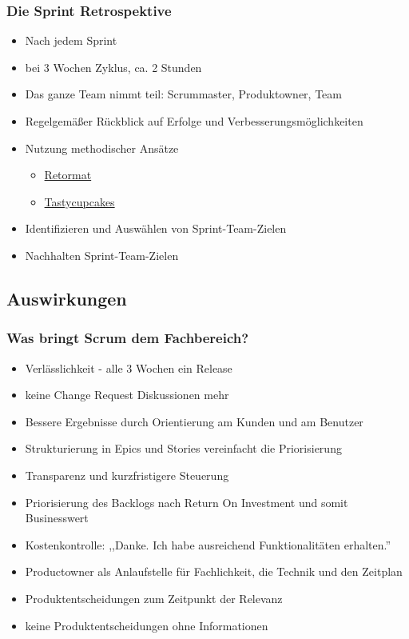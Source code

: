 \frame
{
  \frametitle{Die Sprint Retrospektive}
  \begin{itemize}
      \item{Nach jedem Sprint}
      \item{bei 3 Wochen Zyklus, ca. 2 Stunden}
      \item{Das ganze Team nimmt teil: Scrummaster, Produktowner, Team}
      \item{Regelgemäßer Rückblick auf Erfolge und Verbesserungsmöglichkeiten}
      \item{Nutzung methodischer Ansätze
          \begin{itemize}
            \item{\href{http://plans-for-retrospectives.com}{Retormat}}
            \item{\href{http://tastycupcakes.org/}{Tastycupcakes}}
          \end{itemize}
      }
      \item{Identifizieren und Auswählen von Sprint-Team-Zielen}
      \item{Nachhalten Sprint-Team-Zielen}
  \end{itemize}
}


\subsection{Auswirkungen}
\frame
{
  \frametitle{Was bringt Scrum dem Fachbereich?}
  \begin{itemize}
    \item{Verlässlichkeit - alle 3 Wochen ein Release}
    \item{keine Change Request Diskussionen mehr}
    \item{Bessere Ergebnisse durch Orientierung am Kunden und am Benutzer}
    \item{Strukturierung in Epics und Stories vereinfacht die Priorisierung}
    \item{Transparenz und kurzfristigere Steuerung} 
    \item{Priorisierung des Backlogs nach Return On Investment und somit Businesswert}
    \item{Kostenkontrolle: ,,Danke. Ich habe ausreichend Funktionalitäten erhalten.''}
    \item{Productowner als Anlaufstelle für Fachlichkeit, die Technik und den Zeitplan}
    \item{Produktentscheidungen zum Zeitpunkt der Relevanz}
    \item{keine Produktentscheidungen ohne Informationen}
  \end{itemize}
}


